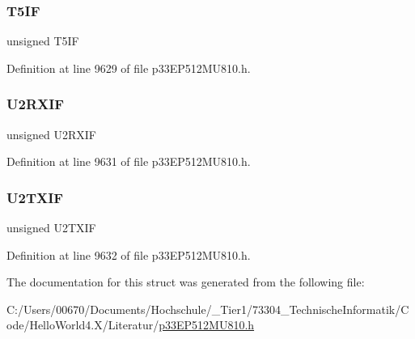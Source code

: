 \subsubsection{\texorpdfstring{T5\+IF}{T5IF}}
{\footnotesize\ttfamily unsigned T5\+IF}



Definition at line 9629 of file p33\+E\+P512\+M\+U810.\+h.

\mbox{\label{structtag_i_f_s1_b_i_t_s_a3e744396e98fbf0f846f49c7aad17fd6}} 
\subsubsection{\texorpdfstring{U2\+R\+X\+IF}{U2RXIF}}
{\footnotesize\ttfamily unsigned U2\+R\+X\+IF}



Definition at line 9631 of file p33\+E\+P512\+M\+U810.\+h.

\mbox{\label{structtag_i_f_s1_b_i_t_s_a66d2dadb9cc3580e0b4f16019147ff88}} 
\subsubsection{\texorpdfstring{U2\+T\+X\+IF}{U2TXIF}}
{\footnotesize\ttfamily unsigned U2\+T\+X\+IF}



Definition at line 9632 of file p33\+E\+P512\+M\+U810.\+h.



The documentation for this struct was generated from the following file\+:\begin{DoxyCompactItemize}
\item 
C\+:/\+Users/00670/\+Documents/\+Hochschule/\+\_\+\+Tier1/73304\+\_\+\+Technische\+Informatik/\+Code/\+Hello\+World4.\+X/\+Literatur/\hyperlink{p33_e_p512_m_u810_8h}{p33\+E\+P512\+M\+U810.\+h}\end{DoxyCompactItemize}
